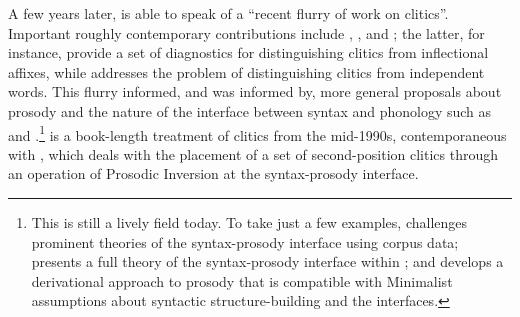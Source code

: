 A few years later, \citet[283]{Zwicky1985} is able to speak of a ``recent flurry of work on clitics''. Important roughly contemporary contributions include \citet{Klavans1979,Klavans1982,Klavans1985},  \citet{Kaisse1982,Kaisse1985}, and \citet{ZwickyPullum1983}; the latter, for instance, provide a set of diagnostics for distinguishing clitics from inflectional affixes, while \citet{Zwicky1985} addresses the problem of distinguishing clitics from independent words. This flurry informed, and was informed by, more general proposals about prosody and the nature of the interface between syntax and phonology such as \citet{Selkirk1984,Selkirk1986} and \citet{NesporVogel1986}.\footnote{This is still a lively field today. To take just a few examples, \citet{Dehe2014} challenges prominent theories of the syntax-prosody interface using corpus data; \citet{Boegel2015} presents a full theory of the syntax-prosody interface within ; and \citet{Guenes2015} develops a derivational approach to prosody that is compatible with Minimalist assumptions about syntactic structure-building and the interfaces.} \citet{Klavans1995} is a book-length treatment of clitics from the mid-1990s, contemporaneous with \citet{Halpern1995}, which deals with the placement of a set of second-position clitics through an operation of Prosodic Inversion at the syntax-prosody interface.

